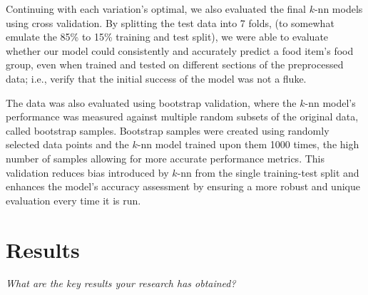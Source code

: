 \documentclass[11pt]{article}
\begin{document}
Continuing with each variation's optimal, we also evaluated the final $k$-nn models using cross validation. By splitting the test data into 7 folds, (to somewhat emulate the 85\% to 15\% training and test split), we were able to evaluate whether our model could consistently and accurately predict a food item's food group, even when trained and tested on different sections of the preprocessed data; i.e., verify that the initial success of the model was not a fluke.

The data was also evaluated using bootstrap validation, where the $k$-nn model's performance was measured against multiple random subsets of the original data, called bootstrap samples. Bootstrap samples were created using randomly selected data points and the $k$-nn model trained upon them 1000 times, the high number of samples allowing for more accurate performance metrics. This validation reduces bias introduced by $k$-nn from the single training-test split and enhances the model's accuracy assessment by ensuring a more robust and unique evaluation every time it is run.

\section{Results}
\emph{What are the key results your research has obtained?}
\end{document}
